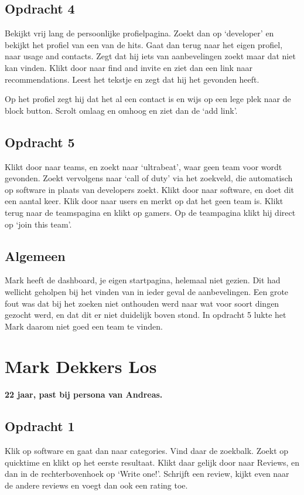 \subsection{Opdracht 4}
Bekijkt vrij lang de persoonlijke profielpagina. Zoekt dan op `developer' en bekijkt het profiel van een van de hits. Gaat dan terug naar het eigen profiel, naar usage and contacts. Zegt dat hij iets van aanbevelingen zoekt maar dat niet kan vinden. Klikt door naar find and invite en ziet dan een link naar recommendations. Leest het tekstje en zegt dat hij het gevonden heeft.

Op het profiel zegt hij dat het al een contact is en wijs op een lege plek naar de block button. Scrolt omlaag en omhoog en ziet dan de `add link'.

\subsection{Opdracht 5}
Klikt door naar teams, en zoekt naar `ultrabeat', waar geen team voor wordt gevonden. Zoekt vervolgens naar `call of duty' via het zoekveld, die automatisch op software in plaats van developers zoekt. Klikt door naar software, en doet dit een aantal keer. Klik door naar users en merkt op dat het geen team is. Klikt terug naar de teamspagina en klikt op gamers. Op de teampagina klikt hij direct op `join this team'.

\subsection{Algemeen}
Mark heeft de dashboard, je eigen startpagina, helemaal niet gezien. Dit had wellicht geholpen bij het vinden van in ieder geval de aanbevelingen. Een grote fout was dat bij het zoeken niet onthouden werd naar wat voor soort dingen gezocht werd, en dat dit er niet duidelijk boven stond. In opdracht 5 lukte het Mark daarom niet goed een team te vinden.

\section{Mark Dekkers Los}
\textbf{22 jaar, past bij persona van Andreas.}

\subsection{Opdracht 1}
Klik op software en gaat dan naar categories. Vind daar de zoekbalk. Zoekt op quicktime en klikt op het eerste resultaat. Klikt daar gelijk door naar Reviews, en dan in de rechterbovenhoek op `Write one!'. Schrijft een review, kijkt even naar de andere reviews en voegt dan ook een rating toe.

